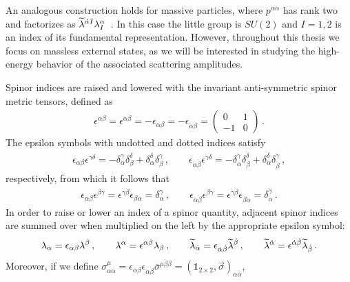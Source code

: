 An analogous construction holds for massive particles, where $p^{\dot\alpha\alpha}$ has rank two
and factorizes as $\widetilde{\lambda}^{\dot\alpha I}\lambda^{\alpha}_I$~\cite{Arkani-Hamed:2017jhn}. In this case the little group is $SU(2)$ and $I=1,2$ is an index of its fundamental representation. However, throughout this thesis we focus on massless external states, as we will be interested in studying the high-energy behavior of the associated scattering amplitudes.

Spinor indices are raised and lowered with the invariant anti-symmetric spinor metric tensors, defined as
\begin{align}
    \epsilon^{\alpha\beta} = \epsilon^{\dot\alpha\dot\beta} = -\epsilon_{\alpha\beta}=-\epsilon_{\dot\alpha\dot\beta}=\begin{pmatrix}
        0 & 1 \\ -1&0
    \end{pmatrix}\,.
\end{align}
The epsilon symbols with undotted and dotted indices satisfy
\begin{align}
    \epsilon_{\alpha\beta}\epsilon^{\gamma\delta}=-\delta^\gamma_\alpha\delta^\delta_\beta+\delta_\alpha^\delta \delta_\beta^\gamma \,, \qquad
    \epsilon_{\dot\alpha\dot\beta}\epsilon^{\dot\gamma\dot\delta}=-\delta^{\dot\gamma}_{\dot\alpha}\delta^{\dot\delta}_{\dot\beta}+\delta_{\dot\alpha}^{\dot\delta} \delta_{\dot\beta}^{\dot\gamma}\,,
\end{align}
respectively,
from which it follows that 
\begin{align}
    \epsilon_{\alpha\beta}\epsilon^{\beta\gamma}=\epsilon^{\gamma\beta}\epsilon_{\beta\alpha} = \delta^\gamma_\alpha\,,
\qquad
    \epsilon_{\dot\alpha\dot\beta}\epsilon^{\dot\beta\dot\gamma}=\epsilon^{\dot\gamma\dot\beta}\epsilon_{\dot\beta\dot\alpha} = \delta^{\dot\gamma}_{\dot\alpha}\,.
\end{align}
In order to raise or lower an index of a spinor quantity, adjacent spinor indices are summed over when multiplied on the left by the appropriate epsilon symbol:
\begin{align}
    \lambda_\alpha = \epsilon_{\alpha\beta}\lambda^\beta \,,\qquad \lambda^\alpha = \epsilon^{\alpha\beta}\lambda_\beta \,,\qquad
    \widetilde{\lambda}_{\dot\alpha} = \epsilon_{\dot\alpha\dot\beta}\widetilde{\lambda}^{\dot\beta}\,, \qquad
    \widetilde{\lambda}^{\dot\alpha} = \epsilon^{\dot\alpha\dot\beta}\widetilde{\lambda}_{\dot\beta}\,.
\end{align}
Moreover, if we define $\sigma^\mu_{\alpha\dot\alpha} = \epsilon_{\alpha\beta}\epsilon_{\dot\alpha\dot\beta}\overline\sigma^{\mu\dot\beta \beta} =(\mathbb 1_{2\times 2}, \vec\sigma)_{\alpha\dot\alpha}$,
